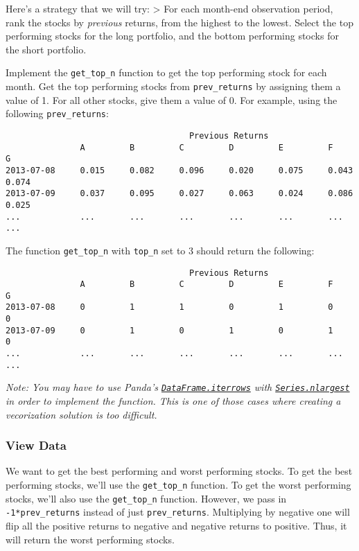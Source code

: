 \documentclass[11pt]{article}
\begin{document}
Here's a strategy that we will try: \textgreater{} For each month-end
observation period, rank the stocks by \emph{previous} returns, from the
highest to the lowest. Select the top performing stocks for the long
portfolio, and the bottom performing stocks for the short portfolio.

Implement the \texttt{get\_top\_n} function to get the top performing
stock for each month. Get the top performing stocks from
\texttt{prev\_returns} by assigning them a value of 1. For all other
stocks, give them a value of 0. For example, using the following
\texttt{prev\_returns}:

\begin{verbatim}
                                     Previous Returns
               A         B         C         D         E         F         G
2013-07-08     0.015     0.082     0.096     0.020     0.075     0.043     0.074
2013-07-09     0.037     0.095     0.027     0.063     0.024     0.086     0.025
...            ...       ...       ...       ...       ...       ...       ...
\end{verbatim}

The function \texttt{get\_top\_n} with \texttt{top\_n} set to 3 should
return the following:

\begin{verbatim}
                                     Previous Returns
               A         B         C         D         E         F         G
2013-07-08     0         1         1         0         1         0         0
2013-07-09     0         1         0         1         0         1         0
...            ...       ...       ...       ...       ...       ...       ...
\end{verbatim}

\emph{Note: You may have to use Panda's
\href{https://pandas.pydata.org/pandas-docs/version/0.21/generated/pandas.DataFrame.iterrows.html}{\texttt{DataFrame.iterrows}}
with
\href{https://pandas.pydata.org/pandas-docs/version/0.21/generated/pandas.Series.nlargest.html}{\texttt{Series.nlargest}}
in order to implement the function. This is one of those cases where
creating a vecorization solution is too difficult.}

    \subsubsection{View Data}\label{view-data}

We want to get the best performing and worst performing stocks. To get
the best performing stocks, we'll use the \texttt{get\_top\_n} function.
To get the worst performing stocks, we'll also use the
\texttt{get\_top\_n} function. However, we pass in
\texttt{-1*prev\_returns} instead of just \texttt{prev\_returns}.
Multiplying by negative one will flip all the positive returns to
negative and negative returns to positive. Thus, it will return the
worst performing stocks.
\end{document}
